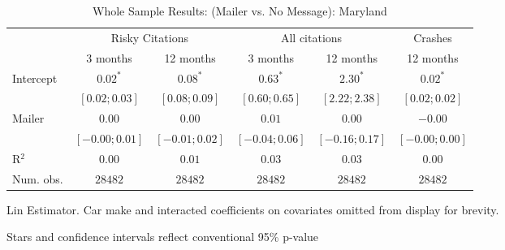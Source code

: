 
\begin{table}
\caption{Whole Sample Results: (Mailer vs. No Message): Maryland}
\begin{center}
\begin{threeparttable}
\begin{tabular}{l c c c c c}
\hline
 & \multicolumn{2}{c}{Risky Citations} & \multicolumn{2}{c}{All citations} & \multicolumn{1}{c}{Crashes} \\
\cline{2-3} \cline{4-5} \cline{6-6}
 & 3 months & 12 months & 3 months & 12 months & 12 months \\
\hline
Intercept & $0.02^{*}$       & $0.08^{*}$       & $0.63^{*}$       & $2.30^{*}$       & $0.02^{*}$       \\
          & $ [ 0.02; 0.03]$ & $ [ 0.08; 0.09]$ & $ [ 0.60; 0.65]$ & $ [ 2.22; 2.38]$ & $ [ 0.02; 0.02]$ \\
Mailer    & $0.00$           & $0.00$           & $0.01$           & $0.00$           & $-0.00$          \\
          & $ [-0.00; 0.01]$ & $ [-0.01; 0.02]$ & $ [-0.04; 0.06]$ & $ [-0.16; 0.17]$ & $ [-0.00; 0.00]$ \\
\hline
R$^2$     & $0.00$           & $0.01$           & $0.03$           & $0.03$           & $0.00$           \\
Num. obs. & $28482$          & $28482$          & $28482$          & $28482$          & $28482$          \\
\hline
\end{tabular}
\begin{tablenotes}[flushleft]
\scriptsize{\item Lin Estimator. Car make and interacted coefficients on covariates omitted from display for brevity.
                             \item Stars and confidence intervals reflect conventional 95\% p-value}
\end{tablenotes}
\end{threeparttable}
\label{table:coefficients}
\end{center}
\end{table}
